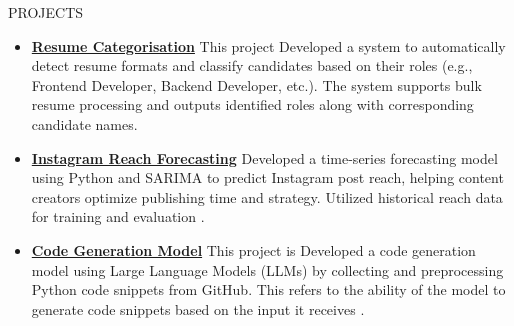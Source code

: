 \documentclass{resume}
\begin{document}
\vspace{1em}
\begin{rSection}{PROJECTS}
    \begin{itemize}
        \item \textbf{\href{https://github.com}{Resume Categorisation}} {This project Developed a system to automatically detect resume formats and classify candidates based on their roles (e.g., Frontend Developer, Backend Developer, etc.). The system supports bulk resume processing and outputs identified roles along with corresponding candidate names.}
        \vspace{0.2em}
        \item \textbf{\href{https://github.com/trishaamandal/Instareach}{Instagram Reach Forecasting}} {Developed a time-series forecasting model using Python and SARIMA to predict Instagram post reach, helping content creators optimize publishing time and strategy. Utilized historical reach data for training and evaluation .}
        \vspace{0.2em}
        \item \textbf{\href{https://github.com}{Code Generation Model}} {This project is Developed a code generation model using Large Language Models (LLMs) by collecting and preprocessing Python code snippets from GitHub. This refers to the ability of the model to generate code snippets based on the input it receives .}
        \vspace{-0.2em}

\end{itemize}
\end{rSection}
\end{document}
